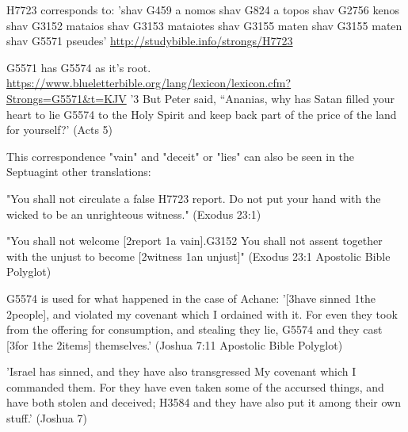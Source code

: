 \documentclass[11pt]{article}
\begin{document}
\begin{thebibliography}{37}
H7723 corresponds to:\newline
'shav G459 a nomos\newline
shav G824 a topos\newline
shav G2756 kenos\newline
shav G3152 mataios\newline
shav G3153 mataiotes\newline
shav G3155 maten\newline
shav G3155 maten\newline
shav G5571 pseudes'\newline
\url{http://studybible.info/strongs/H7723}\newline


G5571 has G5574 as it's root. \newline
\url{https://www.blueletterbible.org/lang/lexicon/lexicon.cfm?Strongs=G5571&t=KJV}
\newline\newline
'3 But Peter said, “Ananias, why has Satan filled your heart to lie G5574 to the Holy Spirit and keep back part of the price of the land for yourself?'
(Acts 5)

This correspondence "vain" and "deceit" or "lies" can also be seen in the Septuagint other translations:

"You shall not circulate a false H7723 report. Do not put your hand with the wicked to be an unrighteous witness."\newline
(Exodus 23:1)

"You shall not welcome [2report 1a vain].G3152 You shall not assent together with the unjust to become [2witness 1an unjust]"\newline
(Exodus 23:1 Apostolic Bible Polyglot)\newline

G5574 is used for what happened in the case of Achane:\newline
'[3have sinned 1the 2people], and violated my covenant which I ordained with it. For even they took from the offering for consumption, and stealing they lie, G5574 and they cast [3for 1the 2items] themselves.'\newline
(Joshua 7:11 Apostolic Bible Polyglot)\newline

'Israel has sinned, and they have also transgressed My covenant which I commanded them. For they have even taken some of the accursed things, and have both stolen and deceived; H3584  and they have also put it among their own stuff.'\newline
(Joshua 7)\newline


\end{thebibliography}
\end{document}

